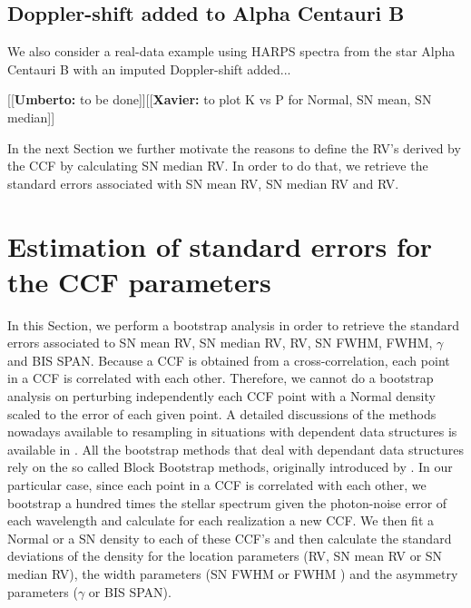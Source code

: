 \documentclass[11pt, oneside]{article}
\newcommand{\xavier}[1]{{\color{blue}[[\textbf{Xavier: }#1]]}}
\newcommand{\umberto}[1]{{\color{green}[[\textbf{Umberto: }#1]]}}
\begin{document}
\subsection{Doppler-shift added to Alpha Centauri B} \label{sec:soap_real}

We also consider a real-data example using HARPS spectra from the star Alpha Centauri B with an imputed Doppler-shift added...

\umberto{to be done}\xavier{to plot K vs P for Normal, SN mean, SN median}

In the next Section we further motivate the reasons to define the RV's derived by the CCF by calculating SN median RV. In order to do that, we retrieve the standard errors associated with SN mean RV, SN median RV and RV.

\section{Estimation of standard errors for the CCF parameters} \label{sec:5}

In this Section, we perform a bootstrap analysis \citep{davison1997bootstrap, efron1994introduction} in order to retrieve the standard errors associated to SN mean RV, SN median RV, RV, SN FWHM, FWHM, $\gamma$ and BIS SPAN. Because a CCF is obtained from a cross-correlation, each point in a CCF is correlated with each other. Therefore, we cannot do a bootstrap analysis on perturbing independently each CCF point with a Normal density scaled to the error of each given point. A detailed discussions of the methods nowadays available to resampling in situations with dependent data structures is available in \citet{lahiri2013resampling}. All the bootstrap methods that deal with dependant data structures rely on the so called Block Bootstrap methods, originally introduced by \citet{wilks1997resampling}. In our particular case, since each point in a CCF is correlated with each other, we bootstrap a hundred times the stellar spectrum given the photon-noise error of each wavelength and calculate for each realization a new CCF. We then fit a Normal or a SN density to each of these CCF's and then calculate the standard deviations of the density for the location parameters (RV, SN mean RV or SN median RV), the width parameters (SN FWHM or FWHM ) and the asymmetry parameters ($\gamma$ or BIS SPAN).
\end{document}

